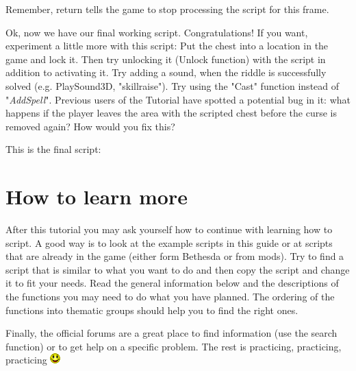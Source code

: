 Remember, return tells the game to stop processing the script for this frame.

Ok, now we have our final working script. Congratulations! If you want, experiment a little more with this script: Put the chest into a location in the game and lock it. Then try unlocking it (Unlock function) with the script in addition to activating it. Try adding a sound, when the riddle is successfully solved (e.g. PlaySound3D, "skillraise"). Try using the "Cast" function instead of "\emph{AddSpell}". Previous users of the Tutorial have spotted a potential bug in it: what happens if the player leaves the area with the scripted chest before the curse is removed again? How would you fix this?

This is the final script:



\hypertarget{how-to-learn-more}{%
\section{How to learn more}\label{how-to-learn-more}}

After this tutorial you may ask yourself how to continue with learning
how to script. A good way is to look at the example scripts in this
guide or at scripts that are already in the game (either form Bethesda
or from mods). Try to find a script that is similar to what you want to
do and then copy the script and change it to fit your needs. Read the
general information below and the descriptions of the functions you may
need to do what you have planned. The ordering of the functions into
thematic groups should help you to find the right ones.

Finally, the official forums are a great place to find information (use
the search function) or to get help on a specific problem. The rest is
practicing, practicing, practicing \includegraphics{media/image5.png}